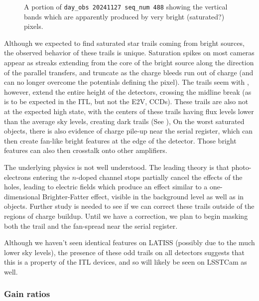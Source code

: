 \begin{figure}
  \begin{center}
    \caption{
      A portion of \texttt{day\_obs 20241127 seq\_num 488} showing the vertical bands which are apparently
        produced by very bright (saturated?) pixels.
    }
\label{fig:darkStreaks}
  \end{center}
\end{figure}

Although we expected to find saturated star trails coming from bright sources, the observed behavior of these trails is unique.
Saturation spikes on most cameras appear as streaks extending from the core of the bright source along the
direction of the parallel transfers, and truncate as the charge bleeds run out of charge (and can no longer
overcome the potentials defining the pixel).
The trails seem with \ComCam, however, extend the entire height of the detectors, crossing the midline break
(as is to be expected in the ITL, but not the E2V, CCDs).
These trails are also not at the expected high state, with the centers of these trails having flux levels
lower than the average sky levels, creating dark trails (See ),
On the worst saturated objects, there is also evidence of charge pile-up near the serial register, which can then create fan-like bright features at the edge of the detector.
Those bright features can also then crosstalk onto other amplifiers.

The underlying physics is not well understood. The leading theory is that photo-electrons entering the
$n$-doped channel stops partially cancel the effects of the holes, leading to electric fields which
produce an effect similar to a one-dimensional Brighter-Fatter effect, visible in the background level as well as in objects.
Further study is needed to see if we can correct these trails outside of the regions of charge buildup.
Until we have a correction, we plan to begin masking both the trail and the fan-spread near the serial register.

Although we haven't seen identical features on LATISS (possibly due to the much lower sky levels), the presence of these odd trails on all \ComCam detectors suggests that this is a property of the ITL devices, and so will likely be seen on LSSTCam as well.

\subsubsection{Gain ratios}

